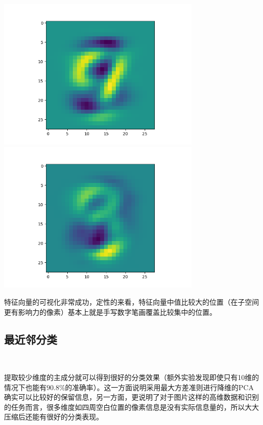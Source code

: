 \documentclass[hyperref,UTF8]{ctexart}
\begin{document}
\includegraphics[height=2.9in]{exp-results/eign1.png}\\
\includegraphics[height=2.9in]{exp-results/eign2.png}\\
\par 特征向量的可视化非常成功，定性的来看，特征向量中值比较大的位置（在子空间更有影响力的像素）基本上就是手写数字笔画覆盖比较集中的位置。
\subsection*{最近邻分类}\
\begin{table}[!htbp]
  \centering
\caption{PCA不同维度下NN分类准确率}
\label{tb:lda_knn}
\end{table}
\par 提取较少维度的主成分就可以得到很好的分类效果（额外实验发现即使只有10维的情况下也能有$90.8\%$的准确率）。这一方面说明采用最大方差准则进行降维的PCA确实可以比较好的保留信息，另一方面，更说明了对于图片这样的高维数据和识别的任务而言，很多维度如四周空白位置的像素信息是没有实际信息量的，所以大大压缩后还能有很好的分类表现。
\end{document}
